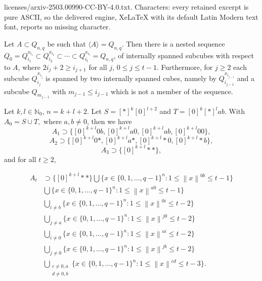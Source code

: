 \documentclass[10pt,a4paper]{amsart}
\renewcommand{\geq}{\geqslant}
\renewcommand{\leq}{\leqslant}
\begin{document}
licenses/arxiv-2503.00990-CC-BY-4.0.txt. Characters: every retained excerpt is pure ASCII, so the delivered engine, XeLaTeX with its default Latin Modern text font, reports no missing character.
\begin{lemma} \label{lemma:nested sequence}
Let $A \subset Q_{n,q}$ be such that $\langle A \rangle =Q_{n,q}$. Then there is a nested sequence $Q_0=Q_{i_1}^{x_{i_1}} \subset Q_{i_2}^{x_{i_2}} \subset \cdots \subset Q_{i_t}^{x_{i_t}}=Q_{n,q}$, of internally spanned subcubes with respect to $A$, where $2i_j+2 \geq i_{j+1}$ for all $j$, $ 0 \leq j \leq t-1$. Furthermore, for $j \geq 2$ each subcube $Q_{i_j}^{x_{i_j}}$ is spanned by two internally spanned cubes, namely by $Q_{i_{j-1}}^{x_{i_{j-1}}}$ and a subcube $Q_{m_{j-1}}$ with $m_{j-1} \leq i_{j-1}$ which is not a member of the sequence. 
\end{lemma}

\begin{lemma} \label{lemma:ST3}
Let $k,l \in \mathbb{N}_0$, $n=k+l+2$. Let $S=[*]^k[0]^{l+2}$ and $T=[0]^k[*]^lab$. With $A_0=S \cup T,$ where $a,b \neq 0$, then we have
$$A_1 \supset \{[0]^{k+l}0b,[0]^{k+l}a0,[0]^{k+l}ab,[0]^{k+l}00\},$$
$$A_2 \supset \{[0]^{k+l}0*,[0]^{k+l}a*,[0]^{k+l}*0,[0]^{k+l}*b\},$$
$$A_3 \supset \{[0]^{k+l}**\},$$
and for all $t \geq 2$,

\begin{align}
 A_t & \supset \{[0]^{k+l}**\}\label{eq:0b}
 \bigcup\{x \in \{0,1,\dots,q-1\}^n:  1 \leq \left \lVert x \right \rVert^{0b} \leq t-1\}\\ 
 \label{eq:a0}
&\bigcup \{x \in \{0,1,\dots,q-1\}^n:  1 \leq \left \lVert x \right \rVert^{a0} \leq t-1\}\\ 
\label{eq:0i}
&\bigcup_{i \neq b} \{x \in \{0,1,\dots,q-1\}^n:  1 \leq \left \lVert x \right \rVert^{0i} \leq t-2\} \\  
\label{eq:jo}
&\bigcup_{j \neq a} \{x \in \{0,1,\dots,q-1\}^n:  1 \leq \left \lVert x \right \rVert^{j0} \leq t-2\} \\ 
\label{eq:ai}
&\bigcup_{i \neq 0} \{x \in \{0,1,\dots,q-1\}^n:  1 \leq \left \lVert x \right \rVert^{ai} \leq t-2\} \\ 
\label{eq:jb}
&\bigcup_{j \neq 0} \{x \in \{0,1,\dots,q-1\}^n:  1 \leq \left \lVert x \right \rVert^{jb} \leq t-2\} \\ 
\label{eq:cd}
&\bigcup_{\substack{c \neq 0,a \\ d \neq 0,b}} \{x \in \{0,1,\dots,q-1\}^n:  1 \leq \left \lVert x \right \rVert^{cd} \leq t-3\}. 
 \end{align}




\end{lemma}
\end{document}
